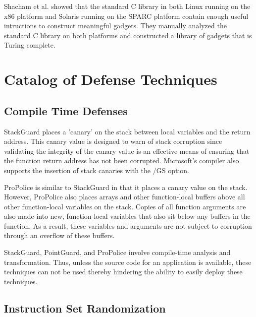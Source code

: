 Shacham et al. showed that the standard C library in both Linux running on the x86 platform and
Solaris running on the SPARC platform contain enough useful intructions to construct meaningful
gadgets. They manually analyzed the standard C library on both platforms and constructed a library
of gadgets that is Turing complete.

\section{Catalog of Defense Techniques}

\subsection{Compile Time Defenses}

StackGuard \cite{stackguard-98} places a 'canary' on the stack between local variables and the
return address. This canary value is designed to warn of stack corruption since validating the
integrity of the canary value is an effective means of ensuring that the function return address has
not been corrupted. Microsoft's compiler also supports the insertion of stack canaries with the /GS
option.

ProPolice \cite{} is similar to StackGuard in that it places a canary value on the stack. However,
ProPolice also places arrays and other function-local buffers above all other function-local
variables on the stack. Copies of all function arguments are also made into new, function-local
variables that also sit below any buffers in the function. As a result, these variables and
arguments are not subject to corruption through an overflow of these buffers. 

StackGuard, PointGuard, and ProPolice involve compile-time analysis and transformation. Thus, unless
the source code for an application is available, these techniques can not be used thereby hindering
the ability to easily deploy these techniques.

\subsection{Instruction Set Randomization}

